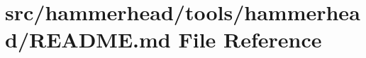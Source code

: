 \hypertarget{tools_2hammerhead_2README_8md}{}\section{src/hammerhead/tools/hammerhead/\+R\+E\+A\+D\+ME.md File Reference}
\label{tools_2hammerhead_2README_8md}
